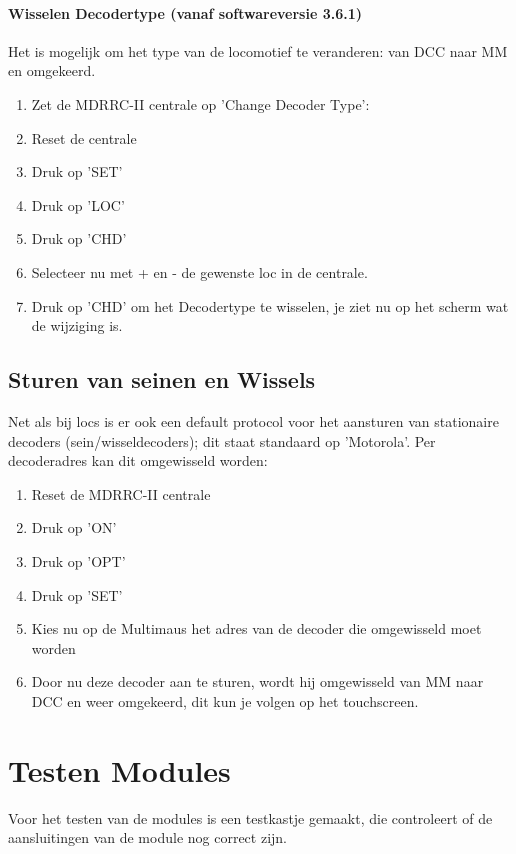 \documentclass[12pt,a4paper]{report}
\begin{document}
\subsubsection{Wisselen Decodertype (vanaf softwareversie 3.6.1)}
Het is mogelijk om het type van de locomotief te veranderen: van DCC naar MM en omgekeerd.
\begin{enumerate}
\item Zet de MDRRC-II centrale op 'Change Decoder Type': 
\item Reset de centrale
\item Druk op 'SET'
\item Druk op 'LOC'
\item Druk op 'CHD'
\item Selecteer nu met + en - de gewenste loc in de centrale.
\item Druk op 'CHD' om het Decodertype te wisselen, je ziet nu op het scherm wat de wijziging is.
\end{enumerate}

\section{Sturen van seinen en Wissels}
Net als bij locs is er ook een default protocol voor het aansturen van stationaire decoders (sein/wisseldecoders); dit staat standaard op 'Motorola'.
Per decoderadres kan dit omgewisseld worden:

\begin{enumerate}
\item Reset de MDRRC-II centrale
\item Druk op 'ON'
\item Druk op 'OPT'
\item Druk op 'SET'
\item Kies nu op de Multimaus het adres van de decoder die omgewisseld moet worden
\item Door nu deze decoder aan te sturen, wordt hij omgewisseld van MM naar DCC en weer omgekeerd, dit kun je volgen op het touchscreen.
\end{enumerate}

\appendix

\chapter{Testen Modules}
Voor het testen van de modules is een testkastje gemaakt, die controleert of de aansluitingen van de module nog correct zijn.
\end{document}
